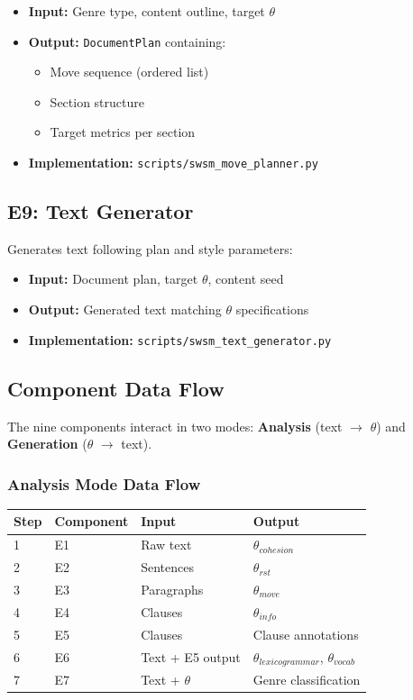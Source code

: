 \begin{itemize}
    \item \textbf{Input:} Genre type, content outline, target $\theta$
    \item \textbf{Output:} \texttt{DocumentPlan} containing:
    \begin{itemize}
        \item Move sequence (ordered list)
        \item Section structure
        \item Target metrics per section
    \end{itemize}
    \item \textbf{Implementation:} \texttt{scripts/swsm\_move\_planner.py}
\end{itemize}

\subsection{E9: Text Generator}
\label{sec:sw-e9}

Generates text following plan and style parameters:

\begin{itemize}
    \item \textbf{Input:} Document plan, target $\theta$, content seed
    \item \textbf{Output:} Generated text matching $\theta$ specifications
    \item \textbf{Implementation:} \texttt{scripts/swsm\_text\_generator.py}
\end{itemize}

\subsection{Component Data Flow}
\label{sec:sw-dataflow}

The nine components interact in two modes: \textbf{Analysis} (text $\rightarrow$ $\theta$) and \textbf{Generation} ($\theta$ $\rightarrow$ text).

\subsubsection{Analysis Mode Data Flow}

\begin{center}
\begin{tabular}{llll}
\toprule
Step & Component & Input & Output \\
\midrule
1 & E1 & Raw text & $\theta_{cohesion}$ \\
2 & E2 & Sentences & $\theta_{rst}$ \\
3 & E3 & Paragraphs & $\theta_{move}$ \\
4 & E4 & Clauses & $\theta_{info}$ \\
5 & E5 & Clauses & Clause annotations \\
6 & E6 & Text + E5 output & $\theta_{lexicogrammar}$, $\theta_{vocab}$ \\
7 & E7 & Text + $\theta$ & Genre classification \\
\bottomrule
\end{tabular}
\end{center}

